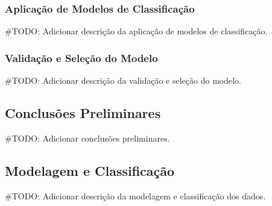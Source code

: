 \documentclass[conference]{IEEEtran}
\begin{document}
\subsubsection{Aplicação de Modelos de Classificação}
#TODO: Adicionar descrição da aplicação de modelos de classificação.






\subsubsection{Validação e Seleção do Modelo}
#TODO: Adicionar descrição da validação e seleção do modelo.


\subsection{Conclusões Preliminares}
#TODO: Adicionar conclusões preliminares.


\subsection{Modelagem e Classificação}
#TODO: Adicionar descrição da modelagem e classificação dos dados.
\end{document}
